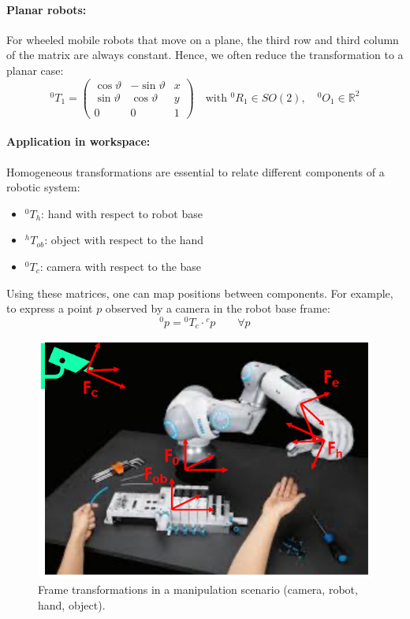\paragraph{Planar robots:}
For wheeled mobile robots that move on a plane, the third row and third column of the matrix are always constant. Hence, we often reduce the transformation to a planar case:
\[
{}^0T_1 = \begin{pmatrix}
\cos\vartheta & -\sin\vartheta & x \\
\sin\vartheta & \cos\vartheta & y \\
0 & 0 & 1
\end{pmatrix}
\quad\text{with } {}^0R_1 \in SO(2), \quad {}^0O_1 \in \mathbb{R}^2
\]

\paragraph{Application in workspace:}
Homogeneous transformations are essential to relate different components of a robotic system:
\begin{itemize}
  \item ${}^0T_h$: hand with respect to robot base
  \item ${}^hT_{ob}$: object with respect to the hand
  \item ${}^0T_c$: camera with respect to the base
\end{itemize}

Using these matrices, one can map positions between components. For example, to express a point $p$ observed by a camera in the robot base frame:
\[
{}^0p = {}^0T_c \cdot {}^c p \qquad \forall p
\]

\begin{figure}[H]
  \centering
  \includegraphics[width=0.65\linewidth]{imgs/homogeneous_workspace_robot.png}
  \caption{Frame transformations in a manipulation scenario (camera, robot, hand, object).}
\end{figure}

